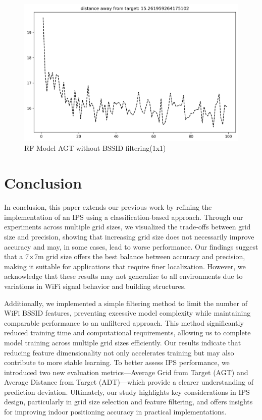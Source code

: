 \documentclass[conference]{IEEEtran}
\begin{document}
\begin{figure}[hbt!]
\begin{minipage}{0.45\textwidth}
			\includegraphics[width=\linewidth]{image7.png}
			\caption{RF Model AGT without BSSID filtering(1x1)}
			\label{fig:rf_agt_nofilter}
		\end{minipage}
	\end{figure}
	
	
	
	\section{Conclusion}
	In conclusion, this paper extends our previous work by refining the implementation of an IPS using a classification-based approach. Through our experiments across multiple grid sizes, we visualized the trade-offs between grid size and precision, showing that increasing grid size does not necessarily improve accuracy and may, in some cases, lead to worse performance. Our findings suggest that a 7×7m grid size offers the best balance between accuracy and precision, making it suitable for applications that require finer localization. However, we acknowledge that these results may not generalize to all environments due to variations in WiFi signal behavior and building structures.
	
	Additionally, we implemented a simple filtering method to limit the number of WiFi BSSID features, preventing excessive model complexity while maintaining comparable performance to an unfiltered approach. This method significantly reduced training time and computational requirements, allowing us to complete model training across multiple grid sizes efficiently. Our results indicate that reducing feature dimensionality not only accelerates training but may also contribute to more stable learning. To better assess IPS performance, we introduced two new evaluation metrics—Average Grid from Target (AGT) and Average Distance from Target (ADT)—which provide a clearer understanding of prediction deviation. Ultimately, our study highlights key considerations in IPS design, particularly in grid size selection and feature filtering, and offers insights for improving indoor positioning accuracy in practical implementations.
	
\end{document}
